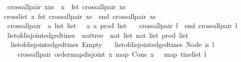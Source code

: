 \begin{isabellebody}
{\isacharbar}\ {\isachardoublequoteopen}cross{\isacharunderscore}all{\isacharunderscore}pair{\isacharprime}\ {\isacharparenleft}x{\isacharhash}xs{\isacharparenright}\ {\isacharequal}\ {\isacharparenleft}x\ {\isacharat}\ fst\ {\isacharparenleft}cross{\isacharunderscore}all{\isacharunderscore}pair{\isacharprime}\ xs{\isacharparenright}{\isacharcomma}\ \isanewline
{\isacharparenleft}crosslist\ x\ {\isacharparenleft}fst\ {\isacharparenleft}cross{\isacharunderscore}all{\isacharunderscore}pair{\isacharprime}\ xs{\isacharparenright}{\isacharparenright}{\isacharparenright}\ {\isacharat}\ snd\ {\isacharparenleft}cross{\isacharunderscore}all{\isacharunderscore}pair{\isacharprime}\ xs{\isacharparenright}{\isacharparenright}{\isachardoublequoteclose}\isanewline
\isanewline
{}\isamarkupfalse%
\ cross{\isacharunderscore}all{\isacharunderscore}pair\ {\isacharcolon}{\isacharcolon}\ {\isachardoublequoteopen}{\isacharparenleft}{\isacharprime}a\ list{\isacharparenright}\ list\ {\isasymRightarrow}\ \ {\isacharparenleft}{\isacharparenleft}{\isacharprime}a{\isacharcomma}\ {\isacharprime}a{\isacharparenright}\ prod{\isacharparenright}\ list{\isachardoublequoteclose}\ \isanewline
\ \ {\isachardoublequoteopen}cross{\isacharunderscore}all{\isacharunderscore}pair\ l\ {\isacharequal}\ snd\ {\isacharparenleft}cross{\isacharunderscore}all{\isacharunderscore}pair{\isacharprime}\ l{\isacharparenright}{\isachardoublequoteclose}\isanewline
\isanewline
{}\isamarkupfalse%
\ list{\isacharunderscore}of{\isacharunderscore}disjoint{\isacharunderscore}edged{\isacharunderscore}tines\ {\isacharcolon}{\isacharcolon}\ {\isachardoublequoteopen}nattree\ {\isasymRightarrow}\ {\isacharparenleft}{\isacharparenleft}nat\ list{\isacharcomma}\ nat\ list{\isacharparenright}\ prod{\isacharparenright}\ list{\isachardoublequoteclose}\ \isanewline
\ \ {\isachardoublequoteopen}list{\isacharunderscore}of{\isacharunderscore}disjoint{\isacharunderscore}edged{\isacharunderscore}tines\ Empty\ {\isacharequal}\ {\isacharbrackleft}{\isacharbrackright}{\isachardoublequoteclose}\isanewline
{\isacharbar}\ {\isachardoublequoteopen}list{\isacharunderscore}of{\isacharunderscore}disjoint{\isacharunderscore}edged{\isacharunderscore}tines\ {\isacharparenleft}Node\ n\ l{\isacharparenright}\ \isanewline
\ \ \ {\isacharequal}\ cross{\isacharunderscore}all{\isacharunderscore}pair\ {\isacharparenleft}order{\isacharunderscore}map{\isacharunderscore}disjoint\ {\isacharparenleft}{\isasymlambda}x{\isachardot}\ map\ {\isacharparenleft}Cons\ x{\isacharparenright}{\isacharparenright}\ \ {}\ {\isacharparenleft}map\ tinelist\ l{\isacharparenright}{\isacharparenright}{\isachardoublequoteclose}\isanewline

\end{isabellebody}
